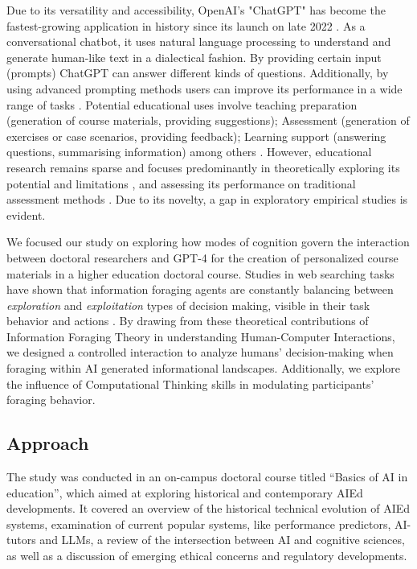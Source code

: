 \documentclass[sn-mathphys, Numbered]{sn-jnl}%
\theoremstyle{thmstyleone}%
\theoremstyle{thmstyletwo}%
\theoremstyle{thmstylethree}%
\begin{document}
Due to its versatility and accessibility, OpenAI's "ChatGPT" has become the fastest-growing application in history since its launch on late 2022 \parencite{milmo_chatgpt_2023}. As a conversational chatbot, it uses natural language processing to understand and generate human-like text in a dialectical fashion. By providing certain input (prompts) ChatGPT can answer different kinds of questions. Additionally, by using advanced prompting methods users can improve its performance in a wide range of tasks \parencite{wei_chain--thought_2023,fernando_promptbreeder_2023}. Potential educational uses involve teaching preparation (generation of course materials, providing suggestions); Assessment (generation of exercises or case scenarios, providing feedback); Learning support (answering questions, summarising information) among others \parencite{lo_what_2023,montenegro-rueda_impact_2023}.  However, educational research remains sparse and focuses predominantly in theoretically exploring its potential and limitations \parencite{qadir_engineering_2022,cain_gpteammate_2023}, and assessing its performance on traditional assessment methods \parencite{nisar_is_2023}. Due to its novelty, a gap in exploratory empirical studies is evident.

We focused our study on exploring how modes of cognition govern the interaction between doctoral researchers and GPT-4 for the creation of personalized course materials in a higher education doctoral course. Studies in web searching tasks have shown that information foraging agents are constantly balancing between \textit{exploration} and \textit{exploitation} types of decision making, visible in their task behavior and actions \parencite{pirolli_information_1999, pirolli_rational_2005, pirolli_information_2007}.  By drawing from these theoretical contributions of Information Foraging Theory in understanding Human-Computer Interactions, we designed a controlled interaction to analyze humans' decision-making when foraging within AI generated informational landscapes. Additionally, we explore the influence of Computational Thinking skills in modulating participants' foraging behavior.



\subsection*{Approach}\label{Approach}  


The study was conducted in an on-campus doctoral course titled “Basics of AI in education”, which aimed at exploring historical and contemporary AIEd developments. It covered an overview of the historical technical evolution of AIEd systems, examination of current popular systems, like performance predictors, AI-tutors and LLMs, a review of the intersection between AI and cognitive sciences, as well as a discussion of emerging ethical concerns and regulatory developments. 
\end{document}
